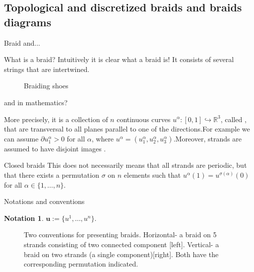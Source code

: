 \documentclass[9pt, english]{beamer}
\theoremstyle{definition}
\newtheorem{notation}[thm]{Notation}
\newcommand{\simbolovettore}[1]{{\boldsymbol{#1}}}
\newcommand{\vu}{\simbolovettore{u}}
\newcommand{\R}{\mathbb{R}}                     %
\begin{document}
\subsection{Topological and discretized braids and braids diagrams}
\begin{frame}{Braid and... }
    \begin{block}{What is a braid?}\pause
        Intuitively it is clear what a braid is! It consists of several strings that are
        intertwined.\pause
        \begin{figure}\label{fig:shoes}
        \caption{Braiding shoes}
        \end{figure}
\end{block}
\end{frame}
\begin{frame}{and in mathematics?}
    \begin{block}{More precisely,}
        it is a collection of $n$ continuous curves
        $u^\alpha:[0,1] \hookrightarrow \R^3$, called
        {\color{green}{
        strands}\/},\pause
        that are transversal to all planes parallel to one of the
        directions.\pause  For example we can assume $\partial u_1^\alpha>0$
        for all $\alpha$, where $u^\alpha=(u_1^\alpha, u_2^\alpha,
        u_3^\alpha)$.\pause Moreover, strands are assumed to have disjoint
        images {\color{red}{(they do not intersect)}.\/}
    \end{block}\pause
    \begin{block}{Closed braids}
        This does not necessarily means that all strands are
        periodic,\pause
        but that there exists a permutation $\sigma$ on $n$ elements such
        that $u^\alpha(1)=u^{\sigma(\alpha)}(0)$ for all $\alpha \in
        \{1, \dots,n\}$.
    \end{block}
\end{frame}
\begin{frame}{Notations and conventions}
        \begin{notation}
        $\vu:=\{u^1, \dots, u^n\}$.
        \end{notation}\pause
        \begin{figure}\label{fig:permutation}
        \caption{Two conventions for presenting braids.
        Horizontal- a braid on 5 strands consisting of two connected component [left]. Vertical- a braid on two strands
        (a single component)[right]. Both have the corresponding permutation indicated.}
        \end{figure}
\end{frame}
\end{document}
